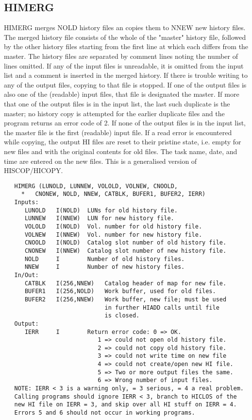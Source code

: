 \subsection{HIMERG}
HIMERG merges NOLD history files an copies them to NNEW new
history files. The merged history file consists of the whole of the
"master" history file, followed by the other history files
starting from the first line at which each differs from the master.
The history files are separated by comment lines noting the
number of lines omitted.
   If any of the input files is unreadable, it is omitted from the
input list and a comment is inserted in the merged history. If
there is trouble writing to any of the output files, copying to
that file is stopped.
   If one of the output files is also one of the (readable) input
files, that file is designated the master. If more that one of
the output files is in the input list, the last such duplicate
is the master; no history copy is attempted for the earlier
duplicate files and the program returns an error code of 2.
   If none of the output files is in the input list, the master
file is the first (readable) input file.
   If a read error is encountered while copying, the output HI
files are reset to their pristine state, i.e. empty for new
files and with the original contents for old files.
The task name, date, and time are entered on the new files.
This is a generalised version of HISCOP/HICOPY.
\begin{verbatim}
   HIMERG (LUNOLD, LUNNEW, VOLOLD, VOLNEW, CNOOLD,
     *   CNONEW, NOLD, NNEW, CATBLK, BUFER1, BUFER2, IERR)
   Inputs:
      LUNOLD   I(NOLD)  LUNs for old history file.
      LUNNEW   I(NNEW)  LUN for new history file.
      VOLOLD   I(NOLD)  Vol. number for old history file.
      VOLNEW   I(NNEW)  Vol. number for new history file.
      CNOOLD   I(NOLD)  Catalog slot number of old history file.
      CNONEW   I(NNEW)  Catalog slot number of new history file.
      NOLD     I        Number of old history files.
      NNEW     I        Number of new history files.
   In/Out:
      CATBLK   I(256,NNEW)   Catalog header of map for new file.
      BUFER1   I(256,NOLD)   Work buffer, used for old files.
      BUFER2   I(256,NNEW)   Work buffer, new file; must be used
                             in further HIADD calls until file
                             is closed.
   Output:
      IERR     I        Return error code: 0 => OK.
                           1 => could not open old history file.
                           2 => could not copy old history file.
                           3 => could not write time on new file
                           4 => could not create/open new HI file.
                           5 => Two or more output files the same.
                           6 => Wrong number of input files.
   NOTE: IERR < 3 is a warning only, = 3 serious, = 4 a real problem.
   Calling programs should ignore IERR < 3, branch to HICLOS of the
   new HI file on IERR = 3, and skip over all HI stuff on IERR = 4.
   Errors 5 and 6 should not occur in working programs.
\end{verbatim}

